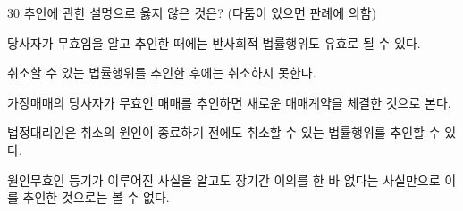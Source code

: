 \begin{question}{30}
추인에 관한 설명으로 옳지 않은 것은? (다툼이 있으면 판례에 의함)
\begin{choices}
  \item 당사자가 무효임을 알고 추인한 때에는 반사회적 법률행위도 유효로 될 수 있다.
  \item 취소할 수 있는 법률행위를 추인한 후에는 취소하지 못한다.
  \item 가장매매의 당사자가 무효인 매매를 추인하면 새로운 매매계약을 체결한 것으로 본다.
  \item 법정대리인은 취소의 원인이 종료하기 전에도 취소할 수 있는 법률행위를 추인할 수 있다.
  \item 원인무효인 등기가 이루어진 사실을 알고도 장기간 이의를 한 바 없다는 사실만으로 이를 추인한 것으로는 볼 수 없다.
\end{choices}
\end{question}
